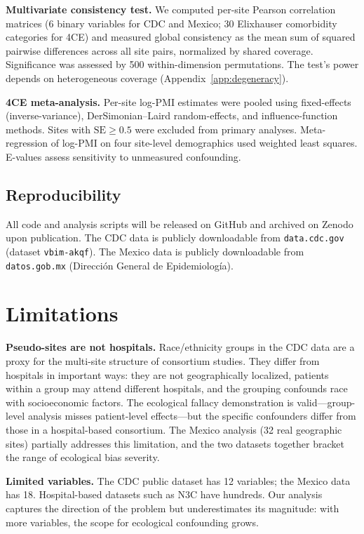 \documentclass{article}
\begin{document}
\textbf{Multivariate consistency test.}  We computed per-site Pearson
correlation matrices (6 binary variables for CDC and Mexico; 30 Elixhauser
comorbidity categories for 4CE) and measured global consistency as the mean
sum of squared pairwise differences across all site pairs, normalized by
shared coverage.  Significance was assessed by 500 within-dimension
permutations.  The test's power depends on heterogeneous coverage
(Appendix~\ref{app:degeneracy}).

\textbf{4CE meta-analysis.}  Per-site log-PMI estimates were pooled using
fixed-effects (inverse-variance), DerSimonian--Laird random-effects, and
influence-function methods.  Sites with $\text{SE} \geq 0.5$ were excluded
from primary analyses.  Meta-regression of log-PMI on four site-level
demographics used weighted least squares.  E-values \cite{vanderweele2017}
assess sensitivity to unmeasured confounding.

\subsection{Reproducibility}

All code and analysis scripts will be released on GitHub and archived on
Zenodo upon publication.
The CDC data is publicly downloadable from \texttt{data.cdc.gov} (dataset
\texttt{vbim-akqf}).  The Mexico data is publicly downloadable from
\texttt{datos.gob.mx} (Direcci\'{o}n General de Epidemiolog\'{i}a).


\section{Limitations}

\textbf{Pseudo-sites are not hospitals.}  Race/ethnicity groups in the CDC
data are a proxy for the multi-site structure of consortium studies.  They
differ from hospitals in important ways: they are not geographically
localized, patients within a group may attend different hospitals, and the
grouping confounds race with socioeconomic factors.  The ecological fallacy
demonstration is valid---group-level analysis misses patient-level
effects---but the specific confounders differ from those in a hospital-based
consortium.  The Mexico analysis (32 real geographic sites) partially
addresses this limitation, and the two datasets together bracket the range
of ecological bias severity.

\textbf{Limited variables.}  The CDC public dataset has 12 variables; the
Mexico data has 18.  Hospital-based datasets such as N3C have hundreds.
Our analysis captures the direction of the problem but underestimates its
magnitude: with more variables, the scope for ecological confounding grows.
\end{document}
